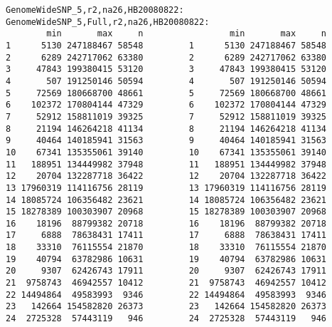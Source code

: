 \documentclass[11pt,a4paper]{article}
\begin{document}
\clearpage
\begin{Verbatim}[fontsize=\small]
GenomeWideSNP_5,r2,na26,HB20080822: GenomeWideSNP_5,Full,r2,na26,HB20080822:
        min       max     n                 min       max     n
1      5130 247188467 58548         1      5130 247188467 58548
2      6289 242717062 63380         2      6289 242717062 63380
3     47843 199380415 53120         3     47843 199380415 53120
4       507 191250146 50594         4       507 191250146 50594
5     72569 180668700 48661         5     72569 180668700 48661
6    102372 170804144 47329         6    102372 170804144 47329
7     52912 158811019 39325         7     52912 158811019 39325
8     21194 146264218 41134         8     21194 146264218 41134
9     40464 140185941 31563         9     40464 140185941 31563
10    67341 135355061 39140         10    67341 135355061 39140
11   188951 134449982 37948         11   188951 134449982 37948
12    20704 132287718 36422         12    20704 132287718 36422
13 17960319 114116756 28119         13 17960319 114116756 28119
14 18085724 106356482 23621         14 18085724 106356482 23621
15 18278389 100303907 20968         15 18278389 100303907 20968
16    18196  88799382 20718         16    18196  88799382 20718
17     6888  78638431 17411         17     6888  78638431 17411
18    33310  76115554 21870         18    33310  76115554 21870
19    40794  63782986 10631         19    40794  63782986 10631
20     9307  62426743 17911         20     9307  62426743 17911
21  9758743  46942557 10412         21  9758743  46942557 10412
22 14494864  49583993  9346         22 14494864  49583993  9346
23   142664 154582820 26373         23   142664 154582820 26373
24  2725328  57443119   946         24  2725328  57443119   946
\end{Verbatim}
\end{document}
